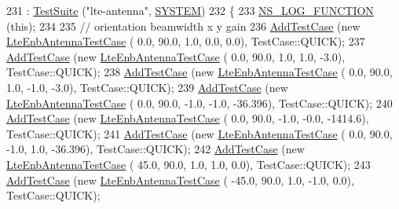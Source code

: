 \begin{DoxyCode}
231   : \hyperlink{classns3_1_1TestSuite_a904b0c40583b744d30908aeb94636d1a}{TestSuite} (\textcolor{stringliteral}{"lte-antenna"}, \hyperlink{classns3_1_1TestSuite_a1ebfcab34ec8161e085e8e3a1855eae0a90c5529a26ab3a5ffcc6e57040dbd82e}{SYSTEM})
232 \{
233   \hyperlink{log-macros-disabled_8h_a90b90d5bad1f39cb1b64923ea94c0761}{NS\_LOG\_FUNCTION} (\textcolor{keyword}{this});
234 
235   \textcolor{comment}{//                                      orientation beamwidth     x            y         gain }
236   \hyperlink{classns3_1_1TestCase_a3718088e3eefd5d6454569d2e0ddd835}{AddTestCase} (\textcolor{keyword}{new} \hyperlink{classLteEnbAntennaTestCase}{LteEnbAntennaTestCase} (       0.0,     90.0,    1.0,    
            0.0,       0.0), TestCase::QUICK);
237   \hyperlink{classns3_1_1TestCase_a3718088e3eefd5d6454569d2e0ddd835}{AddTestCase} (\textcolor{keyword}{new} \hyperlink{classLteEnbAntennaTestCase}{LteEnbAntennaTestCase} (       0.0,     90.0,    1.0,    
            1.0,      -3.0), TestCase::QUICK);
238   \hyperlink{classns3_1_1TestCase_a3718088e3eefd5d6454569d2e0ddd835}{AddTestCase} (\textcolor{keyword}{new} \hyperlink{classLteEnbAntennaTestCase}{LteEnbAntennaTestCase} (       0.0,     90.0,    1.0,    
           -1.0,      -3.0), TestCase::QUICK);
239   \hyperlink{classns3_1_1TestCase_a3718088e3eefd5d6454569d2e0ddd835}{AddTestCase} (\textcolor{keyword}{new} \hyperlink{classLteEnbAntennaTestCase}{LteEnbAntennaTestCase} (       0.0,     90.0,   -1.0,    
           -1.0,   -36.396), TestCase::QUICK);
240   \hyperlink{classns3_1_1TestCase_a3718088e3eefd5d6454569d2e0ddd835}{AddTestCase} (\textcolor{keyword}{new} \hyperlink{classLteEnbAntennaTestCase}{LteEnbAntennaTestCase} (       0.0,     90.0,   -1.0,    
           -0.0,   -1414.6), TestCase::QUICK);
241   \hyperlink{classns3_1_1TestCase_a3718088e3eefd5d6454569d2e0ddd835}{AddTestCase} (\textcolor{keyword}{new} \hyperlink{classLteEnbAntennaTestCase}{LteEnbAntennaTestCase} (       0.0,     90.0,   -1.0,    
            1.0,   -36.396), TestCase::QUICK);
242   \hyperlink{classns3_1_1TestCase_a3718088e3eefd5d6454569d2e0ddd835}{AddTestCase} (\textcolor{keyword}{new} \hyperlink{classLteEnbAntennaTestCase}{LteEnbAntennaTestCase} (      45.0,     90.0,    1.0,    
            1.0,       0.0), TestCase::QUICK);
243   \hyperlink{classns3_1_1TestCase_a3718088e3eefd5d6454569d2e0ddd835}{AddTestCase} (\textcolor{keyword}{new} \hyperlink{classLteEnbAntennaTestCase}{LteEnbAntennaTestCase} (     -45.0,     90.0,    1.0,    
           -1.0,       0.0), TestCase::QUICK);

\end{DoxyCode}
